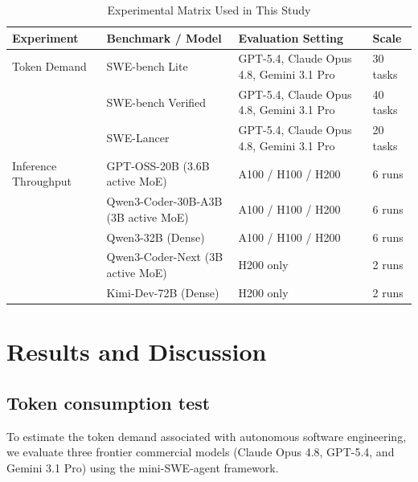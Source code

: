 \documentclass{article}
\begin{document}
\begin{table}[htbp]
\centering
\caption{Experimental Matrix Used in This Study}
\label{tab:experiment_matrix}
\small
\begin{tabular}{llll}
\hline
\textbf{Experiment} &
\textbf{Benchmark / Model} &
\textbf{Evaluation Setting} &
\textbf{Scale} \\
\hline

Token Demand &
SWE-bench Lite &
GPT-5.4, Claude Opus 4.8, Gemini 3.1 Pro &
30 tasks \\

&
SWE-bench Verified &
GPT-5.4, Claude Opus 4.8, Gemini 3.1 Pro &
40 tasks \\

&
SWE-Lancer &
GPT-5.4, Claude Opus 4.8, Gemini 3.1 Pro &
20 tasks \\

\hline

Inference Throughput &
GPT-OSS-20B (3.6B active MoE) &
A100 / H100 / H200 &
6 runs \\

&
Qwen3-Coder-30B-A3B (3B active MoE) &
A100 / H100 / H200 &
6 runs \\

&
Qwen3-32B (Dense) &
A100 / H100 / H200 &
6 runs \\

&
Qwen3-Coder-Next (3B active MoE) &
H200 only &
2 runs \\

&
Kimi-Dev-72B (Dense) &
H200 only &
2 runs \\

\hline
\end{tabular}
\end{table}



\section{Results and Discussion}
\label{sec:results}

\subsection{Token consumption test}

To estimate the token demand associated with autonomous software engineering,
we evaluate three frontier commercial models
(Claude Opus 4.8, GPT-5.4, and Gemini 3.1 Pro)
using the mini-SWE-agent framework.
\end{document}

